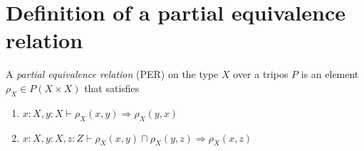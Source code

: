 





\section{Definition of a partial equivalence relation}

\begin{definition}
    A \emph{partial equivalence relation} (PER) on the type \(X\) over a tripos \(P\) is an element \(ρ_X ∈ P(X × X)\) that satisfies
    \begin{enumerate}
        \item \(x : X, y : X ⊢ ρ_X(x,y) ⇒ ρ_X(y,x)\)
        \item \(x : X, y : X, z : Z ⊢ ρ_X(x,y) ⊓ ρ_X(y,z) ⇒ ρ_X(x,z)\)
    \end{enumerate}
\end{definition}

